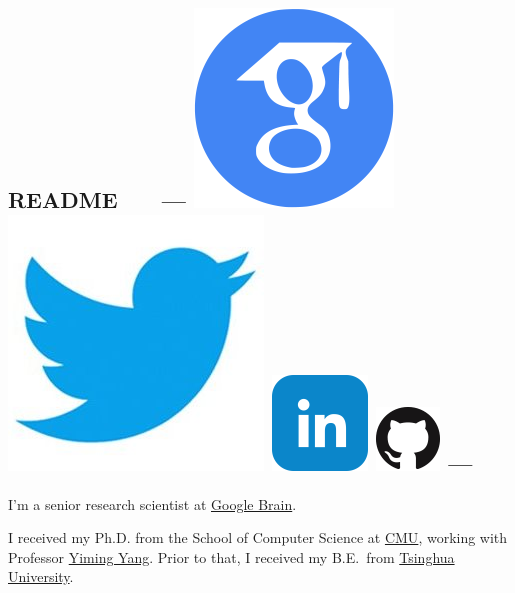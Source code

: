 \documentclass{article}
\begin{document}
\subsection*{README \ \ \ --- \protect
\href{https://scholar.google.com/citations?user=IMkVH_8AAAAJ&hl=en}{\includegraphics[natwidth=22, natheight=22]{img/google-scholar.png}}
\href{https://twitter.com/Hanxiao_6}{\includegraphics[natwidth=22, natheight=22]{img/twitter.jpg}}
\href{https://www.linkedin.com/in/hanxiao-liu-17194a4a/}{\includegraphics[natwidth=22, natheight=22]{img/linkedin.png}}
\href{https://github.com/quark0}{\includegraphics[natwidth=22, natheight=22]{img/GitHub-Mark-64px.png}}
---
}
I'm a senior research scientist at \href{https://ai.google/research/teams/brain}{Google Brain}.

\noindent I received my Ph.D. from
the School of Computer Science at
\href{http://www.cmu.edu/index.shtml}{CMU},
working with Professor \href{http://www.cs.cmu.edu/~yiming/publications.html}{Yiming Yang}.
Prior to that,
I received my B.E.\ from
\href{http://www.tsinghua.edu.cn/publish/newthuen/index.html}{Tsinghua University}.
\end{document}
